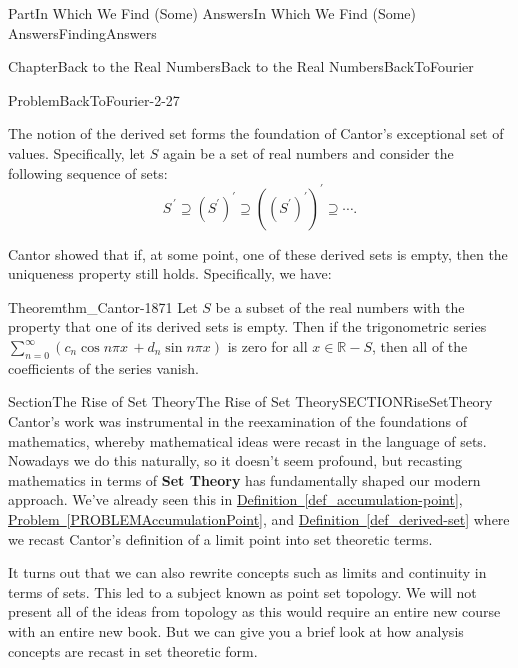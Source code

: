 \documentclass[oneside,10pt,]{book}
\newcommand{\xreffont}{\relax}
\newcommand{\terminology}[1]{\textbf{#1}}
\numberwithin{equation}{part}
\newcommand{\RR}{\mathbb {R}}
\begin{document}
\begin{partptx}{Part}{In Which We Find (Some) Answers}{}{In Which We Find (Some) Answers}{}{}{FindingAnswers}
\begin{chapterptx}{Chapter}{Back to the Real Numbers}{}{Back to the Real Numbers}{}{}{BackToFourier}
\begin{introduction}{}
\begin{problem}{Problem}{}{BackToFourier-2-27}
%
\end{problem}
The notion of the derived set forms the foundation of Cantor's exceptional set of values.  Specifically, let \(S\) again be a set of real numbers and consider the following sequence of sets:%
\begin{equation*}
S^{\,\prime}\supseteq \left(S^\prime\right)^\prime\supseteq \left(\left(S^\prime\right)^\prime\right)^\prime\supseteq \cdots\text{.}
\end{equation*}
%
\par
{} Cantor showed that if, at some point, one of these derived sets is empty, then the uniqueness property still holds. Specifically, we have:%
\begin{theorem}{Theorem}{}{}{thm_Cantor-1871}%
%
Let \(S\) be a subset of the real numbers with the property that one of its derived sets is empty.  Then if the trigonometric series \(\displaystyle\sum_{n=0}^\infty\left(c_n\cos n\pi
x\,+d_n\sin n\pi x\right)\) is zero for all \(x\in\RR-S\), then all of the coefficients of the series vanish.%
\end{theorem}
\end{introduction}%
%
%
\typeout{************************************************}
\typeout{************************************************}
%
\begin{sectionptx}{Section}{The Rise of Set Theory}{}{The Rise of Set Theory}{}{}{SECTIONRiseSetTheory}
Cantor's work was instrumental in the re\textendash{}examination of the foundations of mathematics, whereby mathematical ideas were recast in the language of sets. Nowadays we do this naturally, so it doesn't seem profound, but recasting mathematics in terms of \terminology{Set Theory} has fundamentally shaped our modern approach.  We've already seen this in \hyperref[def_accumulation-point]{Definition~{\xreffont\ref{def_accumulation-point}}}, \hyperref[PROBLEMAccumulationPoint]{Problem~{\xreffont\ref{PROBLEMAccumulationPoint}}}, and \hyperref[def_derived-set]{Definition~{\xreffont\ref{def_derived-set}}} where we recast Cantor's definition of a limit point into set theoretic terms.%
\par
It turns out that we can also rewrite concepts such as limits and continuity in terms of sets.  This led to a subject known as point set topology.  We will not present all of the ideas from topology as this would require an entire new course with an entire new book.  But we can give you a brief look at how analysis concepts are recast in  set theoretic form.%

\end{sectionptx}
\end{chapterptx}
\end{partptx}
\end{document}
